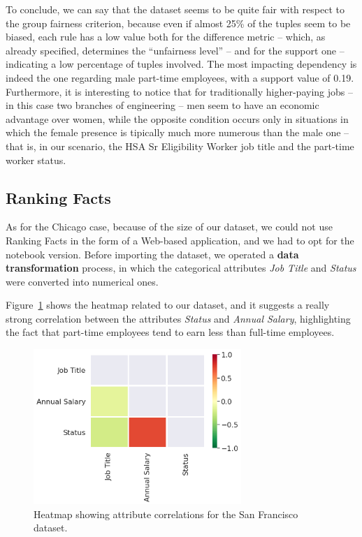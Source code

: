To conclude, we can say that the dataset seems to be quite fair with respect to the group fairness criterion, because even if almost 25\% of the tuples seem to be biased, each rule has a low value both for the difference metric -- which, as already specified, determines the ``unfairness level'' -- and for the support one -- indicating a low percentage of tuples involved. The most impacting dependency is indeed the one regarding male part-time employees, with a support value of 0.19. Furthermore, it is interesting to notice that for traditionally higher-paying jobs -- in this case two branches of engineering -- men seem to have an economic advantage over women, while the opposite condition occurs only in situations in which the female presence is tipically much more numerous than the male one -- that is, in our scenario, the HSA Sr Eligibility Worker job title and the part-time worker status.


\subsection{Ranking Facts}
As for the Chicago case, because of the size of our dataset, we could not use Ranking Facts in the form of a Web-based application, and we had to opt for the notebook version. Before importing the dataset, we operated a \textbf{data transformation} process, in which the categorical attributes \textit{Job Title} and \textit{Status} were converted into numerical ones.

Figure~\ref{fig:san_francisco_rankingfacts1} shows the heatmap related to our dataset, and it suggests a really strong correlation between the attributes \textit{Status} and \textit{Annual Salary}, highlighting the fact that part-time employees tend to earn less than full-time employees.

\begin{figure}[t!]
\centering
\includegraphics[width=0.7\textwidth]{figures/san_francisco_rankingfacts1.png}
\caption{Heatmap showing attribute correlations for the San Francisco dataset.}
\label{fig:san_francisco_rankingfacts1}
\end{figure}

